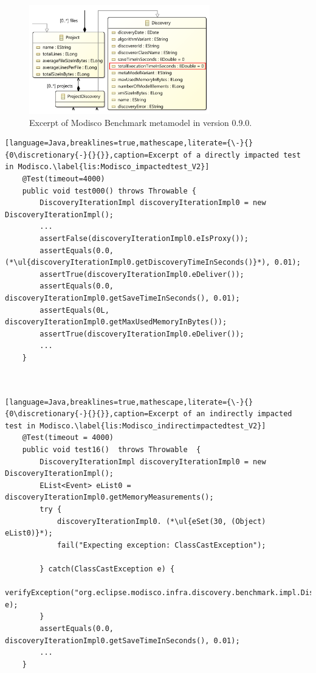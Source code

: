 
\begin{figure}[tb]
	\centering
	\includegraphics[width=0.7\textwidth]{./pics/chapter2pics/excerptmodisco.png}
	
	\caption{Excerpt of Modisco Benchmark metamodel in version 0.9.0.}
	\label{fig:excerptmodisco}
\end{figure}





\begin{lstlisting}[language=Java,breaklines=true,mathescape,literate={\-}{}{0\discretionary{-}{}{}},caption=Excerpt of a directly impacted test in Modisco.\label{lis:Modisco_impactedtest_V2}]
	@Test(timeout=4000)
	public void test000() throws Throwable {
		DiscoveryIterationImpl discoveryIterationImpl0 = new DiscoveryIterationImpl();
		...
		assertFalse(discoveryIterationImpl0.eIsProxy());
		assertEquals(0.0,  (*\ul{discoveryIterationImpl0.getDiscoveryTimeInSeconds()}*), 0.01);
		assertTrue(discoveryIterationImpl0.eDeliver());
		assertEquals(0.0, discoveryIterationImpl0.getSaveTimeInSeconds(), 0.01);
		assertEquals(0L, discoveryIterationImpl0.getMaxUsedMemoryInBytes());
		assertTrue(discoveryIterationImpl0.eDeliver());
		...
	}
	
	
\end{lstlisting}

\begin{lstlisting}[language=Java,breaklines=true,mathescape,literate={\-}{}{0\discretionary{-}{}{}},caption=Excerpt of an indirectly impacted test in Modisco.\label{lis:Modisco_indirectimpactedtest_V2}]
	@Test(timeout = 4000)
	public void test16()  throws Throwable  {
		DiscoveryIterationImpl discoveryIterationImpl0 = new DiscoveryIterationImpl();
		EList<Event> eList0 = discoveryIterationImpl0.getMemoryMeasurements();
		try { 
			discoveryIterationImpl0. (*\ul{eSet(30, (Object) eList0)}*);
			fail("Expecting exception: ClassCastException");
			
		} catch(ClassCastException e) {
			verifyException("org.eclipse.modisco.infra.discovery.benchmark.impl.DiscoveryIterationImpl", e);
		}
		assertEquals(0.0, discoveryIterationImpl0.getSaveTimeInSeconds(), 0.01);
		...
	}
	
\end{lstlisting}



